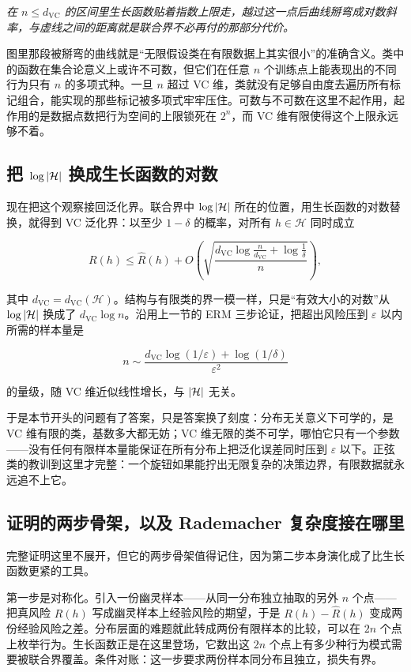 \emph{在 \(n\le d_{\mathrm{VC}}\) 的区间里生长函数贴着指数上限走，越过这一点后曲线掰弯成对数斜率，与虚线之间的距离就是联合界不必再付的那部分代价。}

图里那段被掰弯的曲线就是``无限假设类在有限数据上其实很小''的准确含义。类中的函数在集合论意义上或许不可数，但它们在任意 \(n\) 个训练点上能表现出的不同行为只有 \(n\) 的多项式种。一旦 \(n\) 超过 VC 维，类就没有足够自由度去遍历所有标记组合，能实现的那些标记被多项式牢牢压住。可数与不可数在这里不起作用，起作用的是数据点数把行为空间的上限锁死在 \(2^n\)，而 VC 维有限使得这个上限永远够不着。

\subsection{把 \(\log\left|\mathcal{H}\right|\) 换成生长函数的对数}

现在把这个观察接回泛化界。联合界中 \(\log\left|\mathcal{H}\right|\) 所在的位置，用生长函数的对数替换，就得到 VC 泛化界：以至少 \(1-\delta\) 的概率，对所有 \(h\in\mathcal{H}\) 同时成立

\[
R(h)\le\widehat R(h)
+ O\left(
\sqrt{\frac{d_{\mathrm{VC}}\log\frac{n}{d_{\mathrm{VC}}}+\log\frac{1}{\delta}}{n}}
\right),
\]

其中 \(d_{\mathrm{VC}}=d_{\mathrm{VC}}(\mathcal{H})\)。结构与有限类的界一模一样，只是``有效大小的对数''从 \(\log\left|\mathcal{H}\right|\) 换成了 \(d_{\mathrm{VC}}\log n\)。沿用上一节的 ERM 三步论证，把超出风险压到 \(\varepsilon\) 以内所需的样本量是

\[
n \sim \frac{d_{\mathrm{VC}}\log(1/\varepsilon) + \log(1/\delta)}{\varepsilon^2}
\]

的量级，随 VC 维近似线性增长，与 \(\left|\mathcal{H}\right|\) 无关。

于是本节开头的问题有了答案，只是答案换了刻度：分布无关意义下可学的，是 VC 维有限的类，基数多大都无妨；VC 维无限的类不可学，哪怕它只有一个参数——没有任何有限样本量能保证在所有分布上把泛化误差同时压到 \(\varepsilon\) 以下。正弦类的教训到这里才完整：一个旋钮如果能拧出无限复杂的决策边界，有限数据就永远追不上它。

\subsection{证明的两步骨架，以及 Rademacher 复杂度接在哪里}

完整证明这里不展开，但它的两步骨架值得记住，因为第二步本身演化成了比生长函数更紧的工具。

第一步是对称化。引入一份幽灵样本——从同一分布独立抽取的另外 \(n\) 个点——把真风险 \(R(h)\) 写成幽灵样本上经验风险的期望，于是 \(R(h)-\widehat R(h)\) 变成两份经验风险之差。分布层面的难题就此转成两份有限样本的比较，可以在 \(2n\) 个点上枚举行为。生长函数正是在这里登场，它数出这 \(2n\) 个点上有多少种行为模式需要被联合界覆盖。条件对账：这一步要求两份样本同分布且独立，损失有界。

